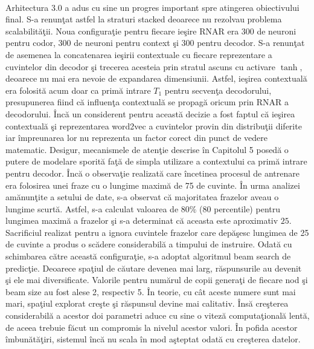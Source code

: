 \paragraph{}
Arhitectura 3.0 a adus cu sine un progres important spre atingerea obiectivului final. S-a renun\c tat astfel la straturi stacked deoarece nu rezolvau problema scalabilit\u a\c tii. Noua configura\c tie pentru fiecare ie\c sire RNAR era 300 de neuroni pentru codor, 300 de neuroni pentru context \c si 300 pentru decodor. S-a renun\c tat de asemenea la concatenarea ie\c sirii contextuale cu fiecare reprezentare a cuvintelor din decodor \c si trecerea acesteia prin stratul ascuns cu activare \(\tanh\), deoarece nu mai era nevoie de expandarea dimensiunii. Astfel, ie\c sirea contextual\u a era folosit\u a acum doar ca prim\u a intrare \(T_1\) pentru secven\c ta decodorului, presupunerea fiind c\u a influen\c ta contextual\u a se propag\u a oricum prin RNAR a decodorului. \^ Inc\u a un considerent pentru aceast\u a decizie a fost faptul c\u a ie\c sirea contextual\u a \c si reprezentarea word2vec a cuvintelor provin din distribu\c tii diferite iar \^ impreunarea lor nu reprezenta un factor corect din punct de vedere matematic. Desigur, mecanismele de aten\c tie descrise \^ in Capitolul 5 posed\u a o putere de modelare sporit\u a fa\c t\u a de simpla utilizare a contextului ca prim\u a intrare pentru decodor. \^ Inc\u a o observa\c tie realizat\u a care \^ incetinea procesul de antrenare era folosirea unei fraze cu o lungime maxim\u a de 75 de cuvinte. \^ In urma analizei am\u anun\c tite a setului de date, s-a observat c\u a majoritatea frazelor aveau o lungime scurt\u a. Astfel, s-a calculat valoarea de \(80\%\) (80 percentile) \cite{johnson2007elementary} pentru lungimea maxim\u a a frazelor \c si s-a determinat c\u a aceasta este aproximativ \(25\). Sacrificiul realizat pentru a ignora cuvintele frazelor care dep\u a\c sesc lungimea de 25 de cuvinte a produs o sc\u adere considerabil\u a a timpului de instruire. Odat\u a cu schimbarea c\u atre aceast\u a configura\c tie, s-a adoptat algoritmul beam search de predic\c tie. Deoarece spa\c tiul de c\u autare devenea mai larg, r\u aspunsurile au devenit \c si ele mai diversificate. Valorile pentru num\u arul de copii genera\c ti de fiecare nod \c si beam size au fost alese 2, respectiv 5. \^ In teorie, cu c\^ at aceste numere sunt mai mari, spa\c tiul explorat cre\c ste \c si r\u aspunsul devine mai calitativ. \^ Ins\u a cre\c sterea considerabil\u a a acestor doi parametri aduce cu sine o vitez\u a computa\c tional\u a lent\u a, de aceea trebuie f\u acut un compromis la nivelul acestor valori. \^ In pofida acestor \^ imbun\u at\u a\c tiri, sistemul \^ inc\u a nu scala \^ in mod a\c steptat odat\u a cu cre\c sterea datelor.

